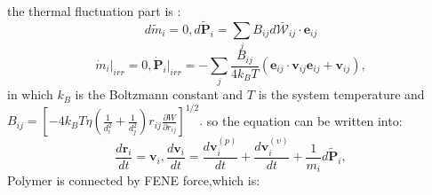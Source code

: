 \documentclass[aps,prl,twocolumn,showpacs,superscriptaddress,groupedaddress]{revtex4}  %
\begin{document}
the thermal fluctuation part is :
\begin{equation}\label{equ:thermalb}
 d\tilde{m}_i=0,
d\tilde{\mathbf{P}}_i=\sum_j B_{ij}d\bar{\mathcal{W}}_{ij}\cdot\mathbf{e}_{ij}
\end{equation}
\begin{equation}\label{equ:thermalfur}
  \dot{m}_i\vert_{irr}=0,
\dot{\mathbf{P}}_i\vert_{irr}=-\sum_j\frac{B_{ij}}{4k_BT}
(\mathbf{e}_{ij}\cdot\mathbf{v}_{ij}\mathbf{e}_{ij}+\mathbf{v}_{ij}),
\end{equation}
in which $k_B$ is the Boltzmann constant and $T$ is the system temperature and 
$B_{ij}=[-4k_BT\eta(\frac{1}{d_{i}^{2}}+\frac{1}{d_{j}^{2}})r_{ij}\frac{\partial W}{\partial r_{ij}}]^{1/2}.$
so the equation can be written into:
\begin{equation}\label{equ:momesum}
 \frac{d\mathbf{r}_i}{dt}=\mathbf{v}_i,
\frac{d\mathbf{v}_i}{dt}=\frac{d\mathbf{v}_{i}^{(p)}}{dt}+\frac{d\mathbf{v}_{i}^{(\upsilon)}}{dt}+\frac{1}{m_i}d\tilde{\mathbf{P}}_i,
\end{equation}
Polymer is connected by FENE force,which is:
\end{document}

